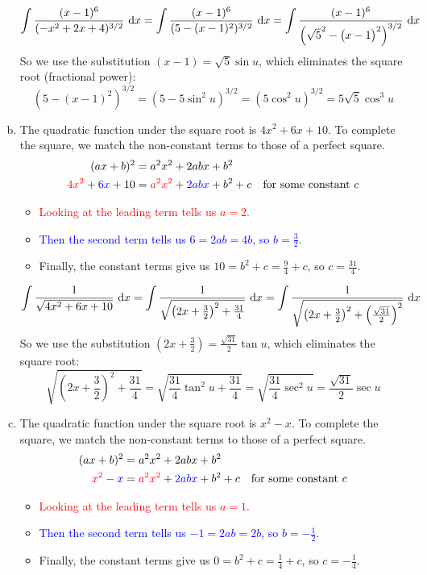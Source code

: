 \begin{solution}
\begin{enumerate}[(a)]
\[\displaystyle\int \dfrac{(x-1)^6}{(-x^2+2x+4)^{3/2}}~\dee{x}=\displaystyle\int \dfrac{(x-1)^6}{(5-(x-1)^2)^{3/2}}~\dee{x}=\displaystyle\int \dfrac{(x-1)^6}{\left(\sqrt{5}^2-\left(x-1\vphantom{\sqrt{3}}\right)^2\right)^{3/2}}~\dee{x}\]
So we use the substitution $(x-1) = \sqrt{5}\sin u$, which eliminates the square root (fractional power):
\[(5-\left(x-1\right)^2)^{3/2}=\left(5-5\sin^2u\right)^{3/2} = \left(5\cos^2 u\right)^{3/2} = 5\sqrt{5}\cos^3 u\]
%
\item
The quadratic function under the square root is $4x^2+6x+10$. To complete the square, we match the non-constant terms to those of a perfect square.
\begin{align*}
(ax+b)^2&=a^2x^2+2abx+b^2\\
\textcolor{red}{4x^2}+\textcolor{blue}{6x}+10&=\textcolor{red}{a^2x^2} + \textcolor{blue}{2abx} +b^2 + c \quad\mbox{for some constant $c$}
\end{align*}
\begin{itemize}
\item \textcolor{red}{Looking at the leading term tells us $a=2$. }
\item \textcolor{blue}{Then the second term tells us $6=2ab=4b$, so $b=\frac{3}{2}$.}
\item Finally, the constant terms give us $10=b^2+c=\frac{9}{4}+c$, so $c=\frac{31}{4}$.
\end{itemize}
\[\displaystyle\int \dfrac{1}{\sqrt{4x^2+6x+10}}~\mathrm{d}x=\displaystyle\int \dfrac{1}{\sqrt{\left(2x+\frac{3}{2}\right)^2+\frac{31}{4}}}~\mathrm{d}x
=\displaystyle\int \dfrac{1}{\sqrt{\left(2x+\frac{3}{2}\right)^2+\left(\frac{\sqrt{31}}{2}\right)^2}}~\mathrm{d}x\]
So we use the substitution $\left(2x+\frac{3}{2}\right) =\frac{\sqrt{31}}{2}\tan u$, which eliminates the square root:
\[\sqrt{\left(2x+\frac{3}{2}\right)^2+\frac{31}{4}}=\sqrt{\frac{31}{4}\tan^2 u +\frac{31}{4}} = \sqrt{\frac{31}{4}\sec^2 u} =\frac{\sqrt{31}}{2}\sec u\]
%
\item
The quadratic function under the square root is $x^2-x$. To complete the square, we match the non-constant terms to those of a perfect square.
\begin{align*}
(ax+b)^2&=a^2x^2+2abx+b^2\\
\textcolor{red}{x^2}-\textcolor{blue}{x}&=\textcolor{red}{a^2x^2} + \textcolor{blue}{2abx} +b^2 + c \quad\mbox{for some constant $c$}
\end{align*}
\begin{itemize}
\item \textcolor{red}{Looking at the leading term tells us $a=1$. }
\item \textcolor{blue}{Then the second term tells us $-1=2ab=2b$, so $b=-\frac{1}{2}$.}
\item Finally, the constant terms give us $0=b^2+c=\frac{1}{4}+c$, so $c=-\frac{1}{4}$.
\end{itemize}



\end{enumerate}
\end{solution}
